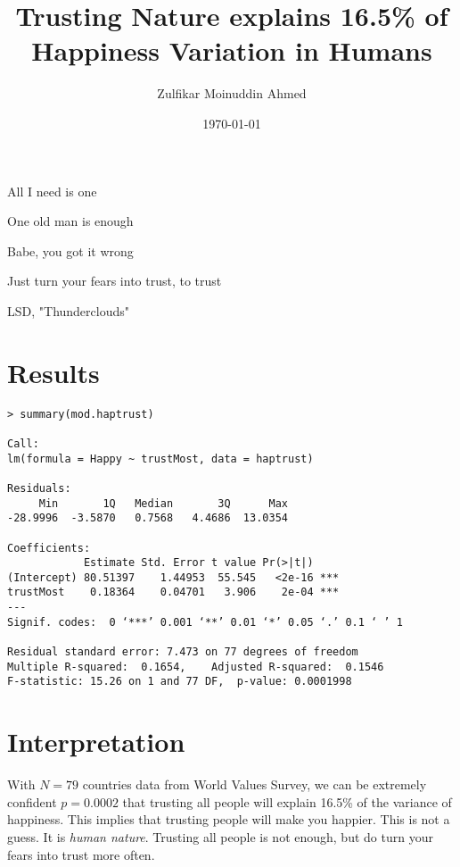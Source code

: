\documentclass{amsart}
\title{Trusting Nature explains 16.5\% of Happiness Variation in Humans}
\author{Zulfikar Moinuddin Ahmed}
\date{\today}
\begin{document}
\maketitle
\epigraph{All I need is one

One old man is enough

Babe, you got it wrong

Just turn your fears into trust, to trust}{LSD, "Thunderclouds"}


\section{Results}

\begin{verbatim}
> summary(mod.haptrust)

Call:
lm(formula = Happy ~ trustMost, data = haptrust)

Residuals:
     Min       1Q   Median       3Q      Max 
-28.9996  -3.5870   0.7568   4.4686  13.0354 

Coefficients:
            Estimate Std. Error t value Pr(>|t|)    
(Intercept) 80.51397    1.44953  55.545   <2e-16 ***
trustMost    0.18364    0.04701   3.906    2e-04 ***
---
Signif. codes:  0 ‘***’ 0.001 ‘**’ 0.01 ‘*’ 0.05 ‘.’ 0.1 ‘ ’ 1

Residual standard error: 7.473 on 77 degrees of freedom
Multiple R-squared:  0.1654,	Adjusted R-squared:  0.1546 
F-statistic: 15.26 on 1 and 77 DF,  p-value: 0.0001998
\end{verbatim}

\section{Interpretation}
With $N=79$ countries data from World Values Survey, we can be extremely confident $p=0.0002$ that trusting all people will explain 16.5\% of the variance of happiness.  This implies that trusting people will make you happier.  This is not a guess.  It is {\em human nature}.  Trusting all people is not enough, but do turn your fears into trust more often.
\end{document}
